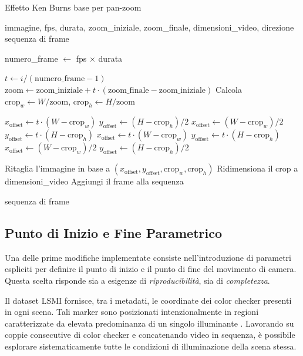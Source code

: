 \begin{algorithm}[H]
\caption{Effetto Ken Burns base per pan-zoom}
\label{alg:Ken_burns_basic}
\begin{algorithmic}[1]
\Require immagine, fps, durata, zoom\_iniziale, zoom\_finale, dimensioni\_video, direzione
\Ensure sequenza di frame

\State numero\_frame $\gets$ fps $\times$ durata

    \State $t \gets i / (\text{numero\_frame} - 1)$
    \State $\text{zoom} \gets \text{zoom\_iniziale} + t \cdot (\text{zoom\_finale} - \text{zoom\_iniziale})$
    \State Calcola $\text{crop}_w \gets W / \text{zoom}$, $\text{crop}_h \gets H / \text{zoom}$
    
        \State $x_{\text{offset}} \gets t \cdot (W - \text{crop}_w)$
        \State $y_{\text{offset}} \gets (H - \text{crop}_h)/2$
        \State $x_{\text{offset}} \gets (W - \text{crop}_w)/2$
        \State $y_{\text{offset}} \gets t \cdot (H - \text{crop}_h)$
        \State $x_{\text{offset}} \gets t \cdot (W - \text{crop}_w)$
        \State $y_{\text{offset}} \gets t \cdot (H - \text{crop}_h)$
    \Else
        \State $x_{\text{offset}} \gets (W - \text{crop}_w)/2$
        \State $y_{\text{offset}} \gets (H - \text{crop}_h)/2$
    \EndIf

    \State Ritaglia l'immagine in base a $(x_{\text{offset}}, y_{\text{offset}}, \text{crop}_w, \text{crop}_h)$
    \State Ridimensiona il crop a dimensioni\_video
    \State Aggiungi il frame alla sequenza
\EndFor

\State \Return sequenza di frame
\end{algorithmic}
\end{algorithm}

\subsection{Punto di Inizio e Fine Parametrico}
Una delle prime modifiche implementate consiste nell'introduzione di parametri espliciti per definire il punto di inizio e il punto di fine del movimento di camera. Questa scelta risponde sia a esigenze di \emph{riproducibilità}, sia di \emph{completezza}.

Il dataset LSMI fornisce, tra i metadati, le coordinate dei color checker presenti in ogni scena. Tali marker sono posizionati intenzionalmente in regioni caratterizzate da elevata predominanza di un singolo illuminante \cite{kim_large_2021}. Lavorando su coppie consecutive di color checker e concatenando video in sequenza, è possibile esplorare sistematicamente tutte le condizioni di illuminazione della scena stessa.

